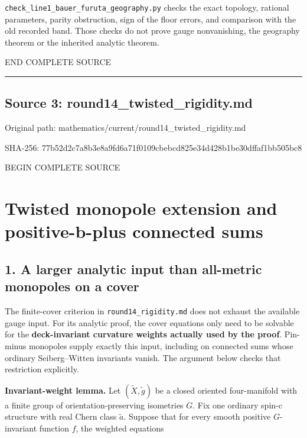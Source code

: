 \documentclass[
  10pt,
]{article}
\begin{document}
\texttt{check\_line1\_bauer\_furuta\_geography.py} checks the exact
topology, rational parameters, parity obstruction, sign of the floor
errors, and comparison with the old recorded band. Those checks do not
prove gauge nonvanishing, the geography theorem or the inherited
analytic theorem.

END COMPLETE SOURCE

\begin{center}\rule{0.5\linewidth}{0.5pt}\end{center}

\hypertarget{source-3-round14_twisted_rigidity.md}{%
\subsection{Source 3:
round14\_twisted\_rigidity.md}\label{source-3-round14_twisted_rigidity.md}}

Original path: mathematics/current/round14\_twisted\_rigidity.md

SHA-256:
77b52d2c7a8b3e8a9fd6a71f0109cbebcd825e34d428b1be30dffaf1bb505bc8

BEGIN COMPLETE SOURCE

\hypertarget{twisted-monopole-extension-and-positive-b-plus-connected-sums}{%
\section{Twisted monopole extension and positive-b-plus connected
sums}\label{twisted-monopole-extension-and-positive-b-plus-connected-sums}}

\hypertarget{a-larger-analytic-input-than-all-metric-monopoles-on-a-cover}{%
\subsection{1. A larger analytic input than all-metric monopoles on a
cover}\label{a-larger-analytic-input-than-all-metric-monopoles-on-a-cover}}

The finite-cover criterion in \texttt{round14\_rigidity.md} does not
exhaust the available gauge input. For its analytic proof, the cover
equations only need to be solvable for the \textbf{deck-invariant
curvature weights actually used by the proof}. Pin-minus monopoles
supply exactly this input, including on connected sums whose ordinary
Seiberg--Witten invariants vanish. The argument below checks that
restriction explicitly.

\textbf{Invariant-weight lemma.} Let \((\widetilde X,\widetilde g)\) be
a closed oriented four-manifold with a finite group of
orientation-preserving isometries \(G\). Fix one ordinary spin-c
structure with real Chern class \(\widetilde a\). Suppose that for every
smooth positive \(G\)-invariant function \(f\), the weighted equations
\end{document}
